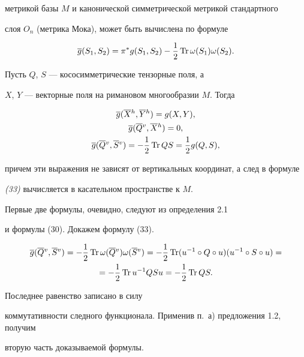 метрикой базы $M$ и канонической симметрической метрикой стандартного


слоя $O_n$ (метрика Мока), может быть вычислена по формуле


\begin{equation}


\ol g(S_1,S_2)=\pi ^* g(S_1,S_2)-\1 \Tr \omega (S_1)\omega (S_2).


\end{equation}





\begin{lems} Пусть $Q$, $S$ --- кососимметрические тензорные поля, а


$X$, $Y$ --- векторные поля на римановом многообразии $M$. Тогда


\begin{gather}


\ol g(\olh X,\olh Y)=g(X,Y),\\


\ol g(\olv Q,\olh X)=0,\\


\ol g(\olv Q,\olv S)= -\1 \Tr QS =\1 g(Q,S),


\end{gather}


причем эти выражения не зависят от вертикальных координат, а след в формуле


{\em (33)} вычисляется в касательном пространстве к $M$.


\end{lems}





\begin{pf} Первые две формулы, очевидно, следуют из определения 2.1


и формулы (30). Докажем формулу (33).


\begin{gather*}


\ol g(\olv Q,\olv S)=-\1 \Tr \w (\olv Q)\w (\olv S)=-\1 \Tr


(u^{-1}\circ Q\circ u)(u^{-1}\circ S\circ u)=\\


=-\1 \Tr u^{-1}QSu=-\1 \Tr QS.


\end{gather*}


Последнее равенство записано в силу


коммутативности следного функционала. Применив п.~а) предложения 1.2, получим


вторую часть доказываемой формулы.


\end{pf}





